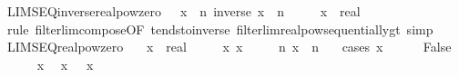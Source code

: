 \begin{isabellebody}
\endisatagproof
{\isafoldproof}%
%
\isadelimproof
\isanewline
%
\endisadelimproof
\isanewline
{}\isamarkupfalse%
\ LIMSEQ{\isacharunderscore}{\kern0pt}inverse{\isacharunderscore}{\kern0pt}realpow{\isacharunderscore}{\kern0pt}zero{\isacharcolon}{\kern0pt}\ {\isachardoublequoteopen}{}\ {\isacharless}{\kern0pt}\ x\ {\isasymLongrightarrow}\ {\isacharparenleft}{\kern0pt}{\isasymlambda}n{\isachardot}{\kern0pt}\ inverse\ {\isacharparenleft}{\kern0pt}x\ {\isacharcircum}{\kern0pt}\ n{\isacharparenright}{\kern0pt}{\isacharparenright}{\kern0pt}\ {\isasymlonglonglongrightarrow}\ {}{\isachardoublequoteclose}\isanewline
\ \ \ x\ {\isacharcolon}{\kern0pt}{\isacharcolon}{\kern0pt}\ real\isanewline
%
\isadelimproof
\ \ %
\endisadelimproof
%
\isatagproof
{}\isamarkupfalse%
\ {\isacharparenleft}{\kern0pt}rule\ filterlim{\isacharunderscore}{\kern0pt}compose{\isacharbrackleft}{\kern0pt}OF\ tendsto{\isacharunderscore}{\kern0pt}inverse{\isacharunderscore}{\kern0pt}{}\ filterlim{\isacharunderscore}{\kern0pt}realpow{\isacharunderscore}{\kern0pt}sequentially{\isacharunderscore}{\kern0pt}gt{}{\isacharbrackright}{\kern0pt}{\isacharparenright}{\kern0pt}\ simp%
\endisatagproof
{\isafoldproof}%
%
\isadelimproof
\isanewline
%
\endisadelimproof
\isanewline
{}\isamarkupfalse%
\ LIMSEQ{\isacharunderscore}{\kern0pt}realpow{\isacharunderscore}{\kern0pt}zero{\isacharcolon}{\kern0pt}\isanewline
\ \ \ x\ {\isacharcolon}{\kern0pt}{\isacharcolon}{\kern0pt}\ real\isanewline
\ \ \ {\isachardoublequoteopen}{}\ {\isasymle}\ x{\isachardoublequoteclose}\ {\isachardoublequoteopen}x\ {\isacharless}{\kern0pt}\ {}{\isachardoublequoteclose}\isanewline
\ \ \ {\isachardoublequoteopen}{\isacharparenleft}{\kern0pt}{\isasymlambda}n{\isachardot}{\kern0pt}\ x\ {\isacharcircum}{\kern0pt}\ n{\isacharparenright}{\kern0pt}\ {\isasymlonglonglongrightarrow}\ {}{\isachardoublequoteclose}\isanewline
%
\isadelimproof
%
\endisadelimproof
%
\isatagproof
{}\isamarkupfalse%
\ {\isacharparenleft}{\kern0pt}cases\ {\isachardoublequoteopen}x\ {\isacharequal}{\kern0pt}\ {}{\isachardoublequoteclose}{\isacharparenright}{\kern0pt}\isanewline
\ \ \isamarkupfalse%
\ False\isanewline
\ \ \isamarkupfalse%
\ {\isacartoucheopen}{}\ {\isasymle}\ x{\isacartoucheclose}\ \isamarkupfalse%
\ x{}{\isacharcolon}{\kern0pt}\ {\isachardoublequoteopen}{}\ {\isacharless}{\kern0pt}\ x{\isachardoublequoteclose}\ \isamarkupfalse%

\end{isabellebody}
